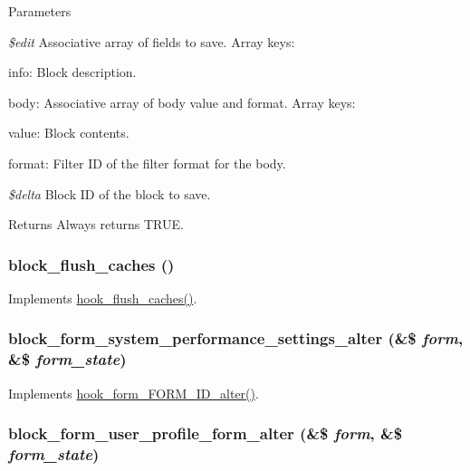 \begin{DoxyParams}{Parameters}
\item[{\em \$edit}]Associative array of fields to save. Array keys:
\begin{DoxyItemize}
\item info: Block description.
\item body: Associative array of body value and format. Array keys:
\begin{DoxyItemize}
\item value: Block contents.
\item format: Filter ID of the filter format for the body. 
\end{DoxyItemize}
\end{DoxyItemize}\item[{\em \$delta}]Block ID of the block to save.\end{DoxyParams}
\begin{DoxyReturn}{Returns}
Always returns TRUE. 
\end{DoxyReturn}
\hypertarget{block_8module_ad7211d9a517eea4580815ed204b6b790}{
\subsubsection[{block\_\-flush\_\-caches}]{\setlength{\rightskip}{0pt plus 5cm}block\_\-flush\_\-caches ()}}
\label{block_8module_ad7211d9a517eea4580815ed204b6b790}
Implements \hyperlink{group__hooks_ga66531e6e564157b7ca45ed07549c9b97}{hook\_\-flush\_\-caches()}. \hypertarget{block_8module_a674b0bc16a35cb4e870657d37eec9c57}{
\subsubsection[{block\_\-form\_\-system\_\-performance\_\-settings\_\-alter}]{\setlength{\rightskip}{0pt plus 5cm}block\_\-form\_\-system\_\-performance\_\-settings\_\-alter (\&\$ {\em form}, \/  \&\$ {\em form\_\-state})}}
\label{block_8module_a674b0bc16a35cb4e870657d37eec9c57}
Implements \hyperlink{group__hooks_ga8d4a4089551493d55911bd5c4f218264}{hook\_\-form\_\-FORM\_\-ID\_\-alter()}. \hypertarget{block_8module_a949dd339f782c50a64b0fb7e1c55b7b2}{
\subsubsection[{block\_\-form\_\-user\_\-profile\_\-form\_\-alter}]{\setlength{\rightskip}{0pt plus 5cm}block\_\-form\_\-user\_\-profile\_\-form\_\-alter (\&\$ {\em form}, \/  \&\$ {\em form\_\-state})}}
